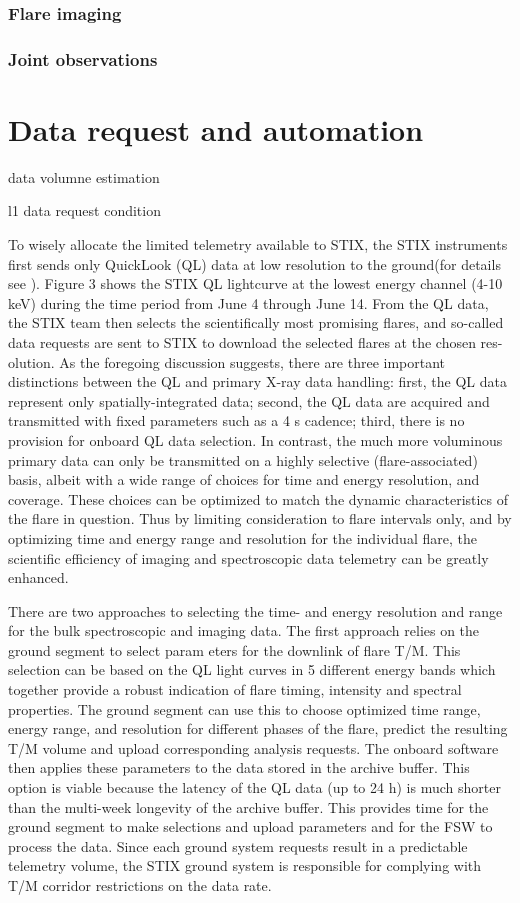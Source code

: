 \documentclass[referee]{aa} %
\begin{document}
\subsubsection{Flare imaging}
\subsubsection{Joint observations}
\section{Data request and automation}
data volumne estimation

l1 data request condition


To wisely allocate the limited telemetry available to STIX,
the STIX instruments first sends only QuickLook (QL) data at
low resolution to the ground(for details see \cite{StixInstrument}).
Figure 3 shows the STIX QL lightcurve at the lowest energy
channel (4-10 keV) during the time period from June 4 through
June 14. From the QL data, the STIX team then selects the scientifically most promising flares, and so-called data requests are
sent to STIX to download the selected flares at the chosen res-
olution.
As the foregoing discussion suggests,
 there are three important distinctions between the 
 QL and primary X-ray data handling: first, the QL data represent only 
 spatially-integrated data;  second, the QL data are acquired and 
 transmitted with fixed parameters such as a 4 s cadence; third, there is no 
 provision for onboard QL data selection. 
In contrast, the much more voluminous primary data can only 
be transmitted on a highly selective (flare-associated) basis, albeit with a wide range of choices for time and energy
 resolution, and coverage. These choices can be optimized to match the dynamic characteristics of the flare in question.  
  Thus by limiting consideration to flare intervals only, and by optimizing time and energy range and 
 resolution for the individual flare, the scientific efficiency of imaging and spectroscopic data telemetry can be greatly enhanced.


There are two approaches to selecting the time- and energy
resolution and range for the bulk spectroscopic and imaging data.
The first approach relies on the ground segment to select param
eters for the downlink of flare T/M. This selection can be based
on the QL light curves in 5 different energy bands which together
provide a robust indication of flare timing, intensity and spectral
properties. The ground segment can use this to choose optimized
time range, energy range, and resolution for different phases of
the flare, predict the resulting T/M volume and upload corresponding analysis requests.
The onboard software then applies
these parameters to the data stored in the archive buffer. This
option is viable because the latency of the QL data (up to 24 h)
is much shorter than the multi-week longevity of the archive
buffer. This provides time for the ground segment to make selections 
and upload parameters and for the FSW to process the data.
Since each ground system requests result in a predictable telemetry volume, 
the STIX ground system is responsible for complying with T/M corridor restrictions on the data rate.
\end{document}
